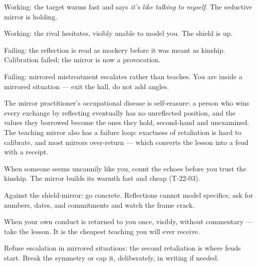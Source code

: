 \begin{feedback}
  \item Working: the target warms fast and says \emph{it's like talking to myself}. The seductive mirror is holding.
  \item Working: the rival hesitates, visibly unable to model you. The shield is up.
  \item Failing: the reflection is read as mockery before it was meant as kinship. Calibration failed; the mirror is now a provocation.
  \item Failing: mirrored mistreatment escalates rather than teaches. You are inside a mirrored situation --- exit the hall, do not add angles.
\end{feedback}
\begin{failure}
The mirror practitioner's occupational disease is self-erasure: a person who wins every exchange by reflecting eventually has no unreflected position, and the values they borrowed become the ones they hold, second-hand and unexamined. The teaching mirror also has a failure loop: exactness of retaliation is hard to calibrate, and most mirrors over-return --- which converts the lesson into a feud with a receipt.
\end{failure}
\begin{countermeasures}
  \item When someone seems uncannily like you, count the echoes before you trust the kinship. The mirror builds its warmth fast and cheap (T-22-03).
  \item Against the shield-mirror: go concrete. Reflections cannot model specifics; ask for numbers, dates, and commitments and watch the frame crack.
  \item When your own conduct is returned to you once, visibly, without commentary --- take the lesson. It is the cheapest teaching you will ever receive.
  \item Refuse escalation in mirrored situations: the second retaliation is where feuds start. Break the symmetry or cap it, deliberately, in writing if needed.
\end{countermeasures}

\seesources
{}
